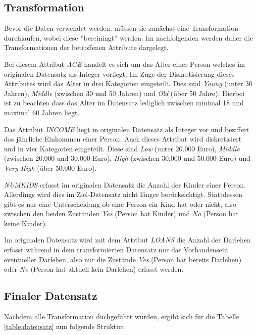 \subsection{Transformation}
\label{id3:datensatz-trans}

Bevor die Daten verwendet werden, müssen sie zunächst eine Transformation durchlaufen, wobei diese ''bereiningt'' werden. Im nachfolgenden werden daher die Transformationen der betroffenen Attribute dargelegt.

Bei diesem Attribut \textit{AGE} handelt es sich um das Alter einer Person welches im originalen Datensatz als Integer vorliegt. Im Zuge der Diskretisierung dieses Attributes wird das Alter in drei Kategorien eingeteilt. Dies sind \textit{Young} (unter 30 Jahren), \textit{Middle} (zwischen 30 und 50 Jahren) und \textit{Old} (über 50 Jahre). Hierbei ist zu beachten dass das Alter im Datensatz lediglich zwischen minimal 18 und maximal 60 Jahren liegt.

Das Attribut \textit{INCOME} liegt in originalen Datensatz als Integer vor und beziffert das jährliche Einkommen einer Person. Auch dieses Attribut wird diskretisiert und in vier Kategorien eingeteilt. Diese sind \textit{Low} (unter 20.000 Euro), \textit{Middle} (zwischen 20.000 und 30.000 Euro), \textit{High} (zwischen 30.000 und 50.000 Euro) und \textit{Very High} (über 50.000 Euro).

\textit{NUMKIDS} erfasst im originalen Datensatz die Anzahl der Kinder einer Person. Allerdings wird dies im Ziel-Datensatz nicht länger berücksichtigt. Stattdessen gibt es nur eine Unterscheidung ob eine Person ein Kind hat oder nicht, also zwischen den beiden Zuständen \textit{Yes} (Person hat Kinder) und \textit{No} (Person hat keine Kinder).

Im originalen Datensatz wird mit dem Attribut \textit{LOANS} die Anzahl der Darlehen erfasst während in dem transformierten Datensatz nur das Vorhandensein eventueller Darlehen, also nur die Zustände \textit{Yes} (Person hat bereits Darlehen) oder \textit{No} (Person hat aktuell kein Darlehen) erfasst werden.

\subsection{Finaler Datensatz}
\label{id3:datensatz-final}

Nachdem alle Transformation duchgeführt wurden, ergibt sich für die Tabelle \ref{table:datensatz} nun folgende Struktur.

